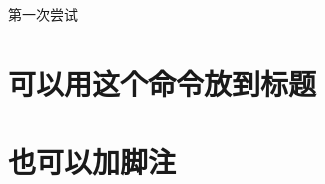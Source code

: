 \documentclass[../try.tex]{subfiles}
\begin{document}
  第一次尝试
  \nocite{rosen2012discrete}
  \section{可以用这个命令放到标题}
  \section{也可以加脚注}
\end{document}
